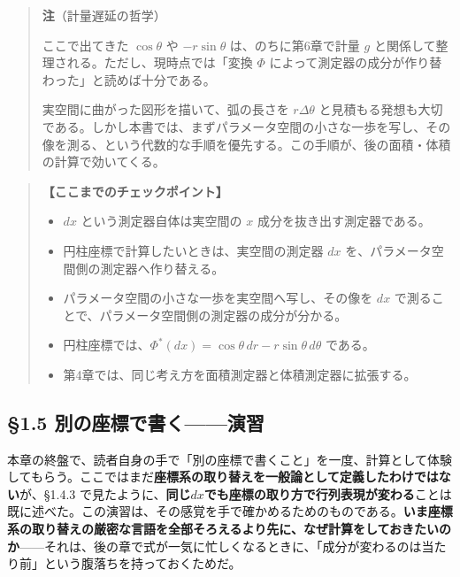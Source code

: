 \documentclass[a4paper,12pt,openany]{book}
\begin{document}
\begin{quote}
\textbf{注}（計量遅延の哲学）

ここで出てきた \(\cos\theta\) や \(-r\sin\theta\) は、のちに第6章で計量
\(g\) と関係して整理される。ただし、現時点では「変換 \(\Phi\)
によって測定器の成分が作り替わった」と読めば十分である。

実空間に曲がった図形を描いて、弧の長さを \(r\Delta\theta\)
と見積もる発想も大切である。しかし本書では、まずパラメータ空間の小さな一歩を写し、その像を測る、という代数的な手順を優先する。この手順が、後の面積・体積の計算で効いてくる。
\end{quote}

\par\vspace{0.35em}\par

\begin{quote}
\textbf{【ここまでのチェックポイント】}

\begin{itemize}
\item
  \(dx\) という測定器自体は実空間の \(x\) 成分を抜き出す測定器である。
\item
  円柱座標で計算したいときは、実空間の測定器 \(dx\)
  を、パラメータ空間側の測定器へ作り替える。
\item
  パラメータ空間の小さな一歩を実空間へ写し、その像を \(dx\)
  で測ることで、パラメータ空間側の測定器の成分が分かる。
\item
  円柱座標では、\(\Phi^*(dx)=\cos\theta\,dr-r\sin\theta\,d\theta\)
  である。
\item
  第4章では、同じ考え方を面積測定器と体積測定器に拡張する。
\end{itemize}
\end{quote}

\par\vspace{0.35em}\par

\hypertarget{ux5225ux306eux5ea7ux6a19ux3067ux66f8ux304fux6f14ux7fd2}{%
\subsection{§1.5
別の座標で書く——演習}\label{ux5225ux306eux5ea7ux6a19ux3067ux66f8ux304fux6f14ux7fd2}}

本章の終盤で、読者自身の手で「別の座標で書くこと」を一度、計算として体験してもらう。ここではまだ\textbf{座標系の取り替えを一般論として定義したわけではない}が、§1.4.3
で見たように、\textbf{同じ}\(dx\)\textbf{でも座標の取り方で行列表現が変わる}ことは既に述べた。この演習は、その感覚を手で確かめるためのものである。\textbf{いま座標系の取り替えの厳密な言語を全部そろえるより先に、なぜ計算をしておきたいのか}——それは、後の章で式が一気に忙しくなるときに、「成分が変わるのは当たり前」という腹落ちを持っておくためだ。
\end{document}
